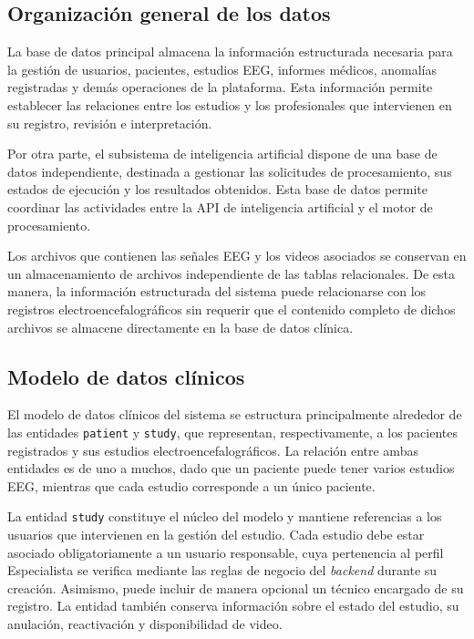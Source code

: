 \subsection{Organización general de los datos}
\label{subsec:organizacion-datos}

La base de datos principal almacena la información
estructurada necesaria para la gestión de usuarios,
pacientes, estudios EEG, informes médicos, anomalías
registradas y demás operaciones de la plataforma.
Esta información permite establecer las relaciones
entre los estudios y los profesionales que intervienen
en su registro, revisión e interpretación.

Por otra parte, el subsistema de inteligencia artificial
dispone de una base de datos independiente, destinada
a gestionar las solicitudes de procesamiento, sus
estados de ejecución y los resultados obtenidos.
Esta base de datos permite coordinar las actividades
entre la API de inteligencia artificial y el motor
de procesamiento.

Los archivos que contienen las señales EEG y los
videos asociados se conservan en un almacenamiento
de archivos independiente de las tablas relacionales.
De esta manera, la información estructurada del
sistema puede relacionarse con los registros
electroencefalográficos sin requerir que el contenido
completo de dichos archivos se almacene directamente
en la base de datos clínica.


\subsection{Modelo de datos clínicos}
\label{subsec:modelo-datos-clinicos}

El modelo de datos clínicos del sistema se estructura
principalmente alrededor de las entidades
\texttt{patient} y \texttt{study}, que representan,
respectivamente, a los pacientes registrados y sus
estudios electroencefalográficos. La relación entre
ambas entidades es de uno a muchos, dado que un
paciente puede tener varios estudios EEG, mientras
que cada estudio corresponde a un único paciente.

La entidad \texttt{study} constituye el núcleo del modelo y mantiene referencias a los usuarios que intervienen en la gestión del estudio. Cada estudio debe estar asociado obligatoriamente a un usuario responsable, cuya pertenencia al perfil Especialista se verifica mediante las reglas de negocio del \textit{backend} durante su creación. Asimismo, puede incluir de manera opcional un técnico encargado de su registro. La entidad también conserva información sobre el estado del estudio, su anulación, reactivación y disponibilidad de video.

